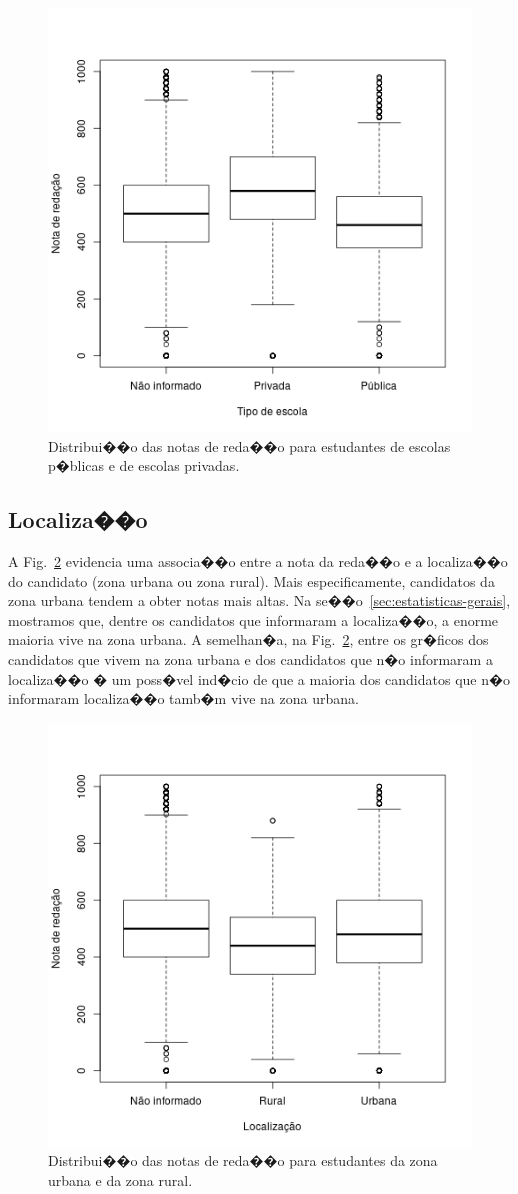 \documentclass[12pt]{article}
\newcommand{\reffig}[1]{Fig.~\ref{fig:#1}}
\begin{document}
\begin{figure}[H]
\centering\includegraphics[width=.5\linewidth]{../correlacao_escola.png}
\caption{Distribui��o das notas de reda��o para estudantes de escolas p�blicas e de escolas privadas.}
\label{fig:correlacao-escola}
\end{figure}

\subsection{Localiza��o}
A \reffig{correlacao-localizacao} evidencia uma associa��o entre a nota da reda��o e a localiza��o do candidato (zona urbana ou zona rural).
Mais especificamente, candidatos da zona urbana tendem a obter notas mais altas.
Na se��o~\ref{sec:estatisticas-gerais}, mostramos que, dentre os candidatos que informaram a localiza��o, a enorme maioria vive na zona urbana.
A semelhan�a, na \reffig{correlacao-localizacao}, entre os gr�ficos dos candidatos que vivem na zona urbana e dos candidatos que n�o informaram a localiza��o � um poss�vel ind�cio de que a maioria dos candidatos que n�o informaram localiza��o tamb�m vive na zona urbana.

\begin{figure}[H]
\centering\includegraphics[width=.45\linewidth]{../correlacao_localizacao.png}
\caption{Distribui��o das notas de reda��o para estudantes da zona urbana e da zona rural.}
\label{fig:correlacao-localizacao}
\end{figure}
\end{document}
